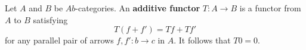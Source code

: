 Let $A$ and $B$ be $\textit{Ab}$-categories. An \textbf{additive functor} $T : A \to B$ is a functor from $A$ to $B$ satisfying
$$
T(f + f') = Tf + Tf'
$$
for any parallel pair of arrows $f, f' : b \to c$ in $A$. It follows that $T0 = 0$.
